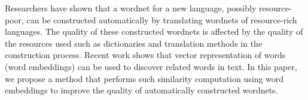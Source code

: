Researchers have shown that a wordnet for a new language, possibly resource-poor, can be constructed automatically by translating wordnets of resource-rich languages. The quality of these constructed wordnets is affected by the quality of the resources used such as dictionaries and translation methods in the construction process. Recent work shows that vector representation of words (word embeddings) can be used to discover related words in text. In this paper, we propose a method that performs such similarity computation using word embeddings to improve the quality of automatically constructed wordnets.
